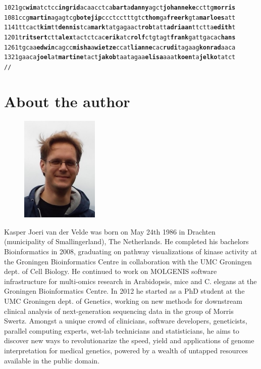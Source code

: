 \begin{appendices}
\begin{alltt}
     1021 gc\textbf{wim}atctc c\textbf{ingrid}aca acctca\textbf{bart} a\textbf{danny}agct \textbf{johanneke}c cttg\textbf{morris}
     1081 ccg\textbf{martin}a gagtcg\textbf{bote} \textbf{jip}ccctcct ttgtc\textbf{thom}g a\textbf{freerk}gta \textbf{marloes}att
     1141 ttcact\textbf{kim}t t\textbf{dennis}tca \textbf{mark}tatgag aact\textbf{rob}tat t\textbf{adriaan}tt ctta\textbf{edith}t
     1201 t\textbf{ritsert}ct t\textbf{alex}tactc tcac\textbf{erik}at c\textbf{rolf}ctgta gt\textbf{frank}gat tgacac\textbf{hans}
     1261 tgcaa\textbf{edwin} cagcc\textbf{misha} a\textbf{wietze}cca t\textbf{lianne}cac \textbf{rudi}tagaag \textbf{konrad}aaca
     1321 gaaca\textbf{joel}a t\textbf{martine}ta ct\textbf{jakob}taa tagaa\textbf{elisa} aaat\textbf{koen}ta \textbf{jelko}tatct
//
\end{alltt}



\chapter{About the author}

\begin{figure}
  \begin{center}
    \includegraphics[width=0.33\textwidth]{img/joeri2}
  \end{center}
\end{figure}
Kasper Joeri van der Velde was born on May 24th 1986 in Drachten (municipality of Smallingerland), The Netherlands.
He completed his bachelors Bioinformatics in 2008, graduating on pathway visualizations of kinase activity at the Groningen Bioinformatics Centre in collaboration with the UMC Groningen dept. of Cell Biology.
He continued to work on MOLGENIS software infrastructure for multi-omics research in Arabidopsis, mice and C. elegans at the Groningen Bioinformatics Centre.
In 2012 he started as a PhD student at the UMC Groningen dept. of Genetics, working on new methods for downstream clinical analysis of next-generation sequencing data in the group of Morris Swertz.
Amongst a unique crowd of clinicians, software developers, geneticists, parallel computing experts, wet-lab technicians and statisticians, he aims to discover new ways to revolutionarize the speed, yield and applications of genome interpretation for medical genetics, powered by a wealth of untapped resources available in the public domain.


\end{appendices}
